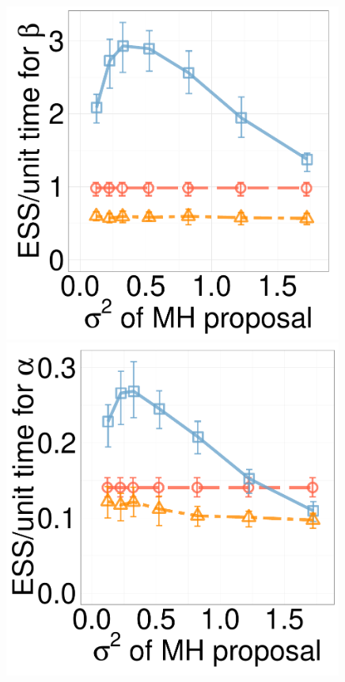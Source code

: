 \begin{figure}[H]
\begin{minipage}[hp]{0.24\linewidth}
    \includegraphics [width=0.99\textwidth, angle=0]{figs/new_experiment_figs/cq_beta_dim3_k2.pdf}
	\end{minipage}
  \begin{minipage}[hp]{0.24\linewidth}
  \centering
    \includegraphics [width=0.99\textwidth, angle=0]{figs/new_experiment_figs/cq_alpha_dim10_k2.pdf}

\end{minipage}
\end{figure}
